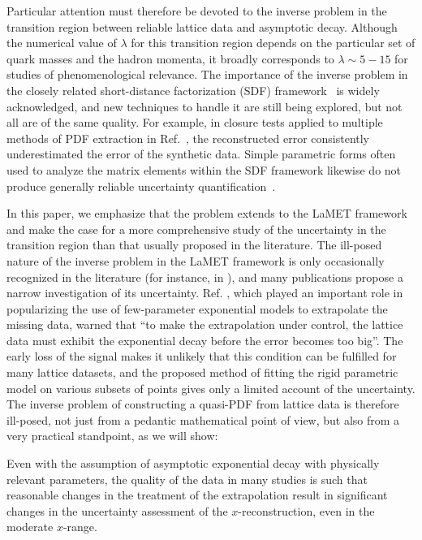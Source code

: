 \documentclass[aps,prl,groupedaddress,twocolumn,superscriptaddress,amsfonts,amssymb,amsmath,showpacs,floatfix,preprintnumbers]{revtex4-2}
\begin{document}
Particular attention must therefore be devoted to the inverse problem in the transition region between reliable lattice data and asymptotic decay. Although the numerical value of $\lambda$ for this transition region depends on the particular set of quark masses and the hadron momenta, it broadly corresponds to $\lambda \sim 5 - 15$ for studies of phenomenological relevance. The importance of the inverse problem in the closely related short-distance factorization (SDF) framework~\cite{Braun:2007wv,Radyushkin:2017cyf,Ma:2017pxb} is widely acknowledged, and new techniques to handle it are still being explored, but not all are of the same quality. For example,  in closure tests applied to multiple methods of PDF extraction in Ref.~\cite{Karpie:2019eiq}, the reconstructed error consistently underestimated the error of the synthetic data. Simple parametric forms often used to analyze the matrix elements within the SDF framework likewise do not produce generally reliable uncertainty quantification~\cite{Dutrieux:2024rem}.

In this paper, we emphasize that the problem extends to the LaMET framework and make the case for a more comprehensive study of the uncertainty in the transition region than that usually proposed in the literature. The ill-posed nature of the inverse problem in the LaMET framework is only occasionally recognized in the literature (for instance, in \cite{Bhattacharya:2023nmv}), and many publications propose a narrow investigation of its uncertainty. Ref. \cite{Ji:2020brr}, which played an important role in popularizing the use of few-parameter exponential models to extrapolate the missing data, warned that ``to make
the extrapolation under control, the lattice data must exhibit the
exponential decay before the error becomes too big''. The early loss of the signal makes it unlikely that this condition can be fulfilled for many lattice datasets, and the proposed method of fitting the rigid parametric model on various subsets of points gives only a limited account of the uncertainty. The inverse problem of constructing a quasi-PDF from lattice data is therefore ill-posed, not just from a pedantic mathematical point of view, but also from a very practical standpoint, as we will show: 

Even with the assumption of asymptotic exponential decay with physically relevant parameters, the quality of the data in many studies is such that reasonable changes in the treatment of the extrapolation result in significant changes in the uncertainty assessment of the $x$-reconstruction, even in the moderate $x$-range.
\end{document}
